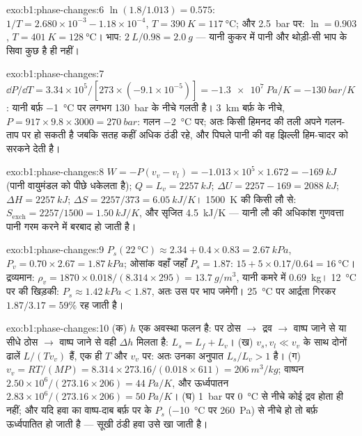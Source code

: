 \begin{solution}{exo:b1:phase-changes:6}
$\ln(1.8/1.013) = 0.575$: $1/T = 2.680 \times 10^{-3} - 1.18 \times 10^{-4}$,
$T = \qty{390}{K} = \qty{117}{\degreeCelsius}$; और \qty{2.5}{bar} पर: $\ln = 0.903$,
$T = \qty{401}{K} = \qty{128}{\degreeCelsius}$। भाप: $\qty{2}{L}/0.98 =
\qty{2.0}{g}$ --- यानी कुकर में पानी और थोड़ी-सी भाप के सिवा कुछ है ही
नहीं।
\end{solution}

\begin{solution}{exo:b1:phase-changes:7}
$\dd P/\dd T = 3.34 \times 10^5/[273 \times (-9.1 \times 10^{-5})] = \qty{-1.3e7}{Pa/K}
= \qty{-130}{bar/K}$: यानी बर्फ़ \qty{-1}{\degreeCelsius} पर लगभग
\qty{130}{bar} के नीचे गलती है। \qty{3}{km} बर्फ़ के नीचे, $P = 917 \times 9.8 \times 3000 =
\qty{270}{bar}$: गलन \qty{-2}{\degreeCelsius} पर; अतः किसी हिमनद की तली अपने
गलन-ताप पर हो सकती है जबकि सतह कहीं अधिक ठंडी रहे, और पिघले पानी की वह
झिल्ली हिम-चादर को सरकने देती है।
\end{solution}

\begin{solution}{exo:b1:phase-changes:8}
$W = -P(v_v - v_l) = -1.013 \times 10^5 \times 1.672 = \qty{-169}{kJ}$ (पानी
वायुमंडल को पीछे धकेलता है); $Q = L_v = \qty{2257}{kJ}$; $\Delta U = 2257 - 169
= \qty{2088}{kJ}$; $\Delta H = \qty{2257}{kJ}$; $\Delta S = 2257/373 = \qty{6.05}{kJ/K}$।
\qty{1500}{K} की किसी लौ से: $S_{\mathrm{exch}} = 2257/1500 = \qty{1.50}{kJ/K}$,
और सृजित \qty{4.5}{kJ/K} --- यानी लौ की अधिकांश गुणवत्ता पानी गरम करने में
बरबाद हो जाती है।
\end{solution}

\begin{solution}{exo:b1:phase-changes:9}
$P_s(\qty{22}{\degreeCelsius}) \approx 2.34 + 0.4 \times 0.83 = \qty{2.67}{kPa}$,
$P_v = 0.70 \times 2.67 = \qty{1.87}{kPa}$; ओसांक वहाँ जहाँ $P_s = 1.87$: $15 +
5 \times 0.17/0.64 = \qty{16}{\degreeCelsius}$। द्रव्यमान: $\rho_v = 1870 \times 0.018/
(8.314 \times 295) = \qty{13.7}{g/m^3}$, यानी कमरे में \qty{0.69}{kg}।
\qty{12}{\degreeCelsius} पर की खिड़की: $P_s \approx \qty{1.42}{kPa} < 1.87$, अतः उस पर भाप जमेगी।
\qty{25}{\degreeCelsius} पर आर्द्रता गिरकर $1.87/3.17 = 59\%$ रह जाती है।
\end{solution}

\begin{solution}{exo:b1:phase-changes:10}
(क) $h$ एक अवस्था फलन है:  पर ठोस $\to$ द्रव $\to$ वाष्प जाने
से या सीधे ठोस $\to$ वाष्प जाने से वही $\Delta h$ मिलता है:
$L_s = L_f + L_v$। (ख) $v_s, v_l \ll v_v$ के साथ दोनों ढालें
$L/(Tv_v)$ हैं, एक ही $T$ और $v_v$ पर: अतः उनका अनुपात $L_s/L_v > 1$ है। (ग) $v_v = RT/(MP) =
8.314 \times 273.16/(0.018 \times 611) = \qty{206}{m^3/kg}$; वाष्पन
$2.50 \times 10^6/(273.16 \times 206) = \qty{44}{Pa/K}$, और ऊर्ध्वपातन $2.83 \times 10^6/
(273.16 \times 206) = \qty{50}{Pa/K}$। (घ) \qty{1}{bar} पर
\qty{0}{\degreeCelsius} से नीचे कोई द्रव होता ही नहीं; और यदि हवा का
वाष्प-दाब बर्फ़ पर के $P_s$ (\qty{-10}{\degreeCelsius} पर \qty{260}{Pa}) से
नीचे हो तो बर्फ़ ऊर्ध्वपातित हो जाती है --- सूखी ठंडी हवा उसे खा जाती है।
\end{solution}

